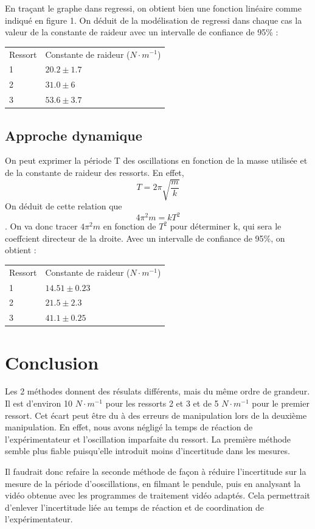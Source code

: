 \documentclass[a4paper,10pt,french]{scrartcl}
\begin{document}
En traçant le graphe dans regressi, on obtient bien une fonction linéaire comme indiqué en figure 1. On déduit de la modélisation de regressi dans chaque cas la valeur de la constante de raideur avec un intervalle de confiance de 95\%  :
\begin{center}
\begin{tabular}{ll}
Ressort & Constante de raideur (\(N\cdot m^{-1}\))\\
1 & \(20.2\pm 1.7\)\\
2 & \(31.0\pm 6\)\\
3 & \(53.6\pm3.7\)
\end{tabular}
\end{center}

\subsection{Approche dynamique}
On peut exprimer la période T des oscillations en fonction de la masse utilisée et de la constante de raideur des ressorts. En effet, \[T = 2\pi \sqrt{\frac{m}{k}}\] On déduit de cette relation que \[4\pi^2m = kT^2\]. On va donc tracer \(4\pi^2m\) en fonction de \(T^2\) pour déterminer k, qui sera le coeffcient directeur de la droite. Avec un intervalle de confiance de 95\%, on obtient :

\begin{center}
\begin{tabular}{ll}
Ressort & Constante de raideur (\(N\cdot m^{-1}\))\\
1 & \(14.51\pm 0.23\)\\
2 & \(21.5\pm 2.3\)\\
3 & \(41.1\pm0.25\)
\end{tabular}
\end{center}

\section{Conclusion}
Les 2 méthodes donnent des résulats différents, mais du m\^eme ordre de grandeur. Il est d'environ 10 \(N\cdot m^{-1}\) pour les ressorts 2 et 3 et de 5 \(N\cdot m^{-1}\) pour le premier ressort. Cet écart peut \^etre du à des erreurs de manipulation lors de la deuxième manipulation. En effet, nous avons négligé la temps de réaction de l'expérimentateur et l'oscillation imparfaite du ressort. La première méthode semble plus fiable puisqu'elle introduit moins d'incertitude dans les mesures.

Il faudrait donc refaire la seconde méthode de façon à réduire l'incertitude sur la mesure de la période d'ooscillations, en filmant le pendule, puis en analysant la vidéo obtenue avec les programmes de traitement vidéo adaptés. Cela permettrait d'enlever l'incertitude liée au temps de réaction et de coordination de l'expérimentateur.
\end{document}
